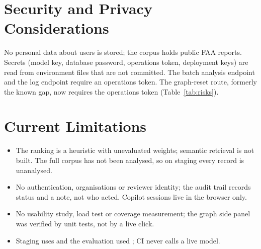 \section{Security and Privacy Considerations}
No personal data about users is stored; the corpus holds public FAA reports. Secrets (model key, database password, operations token, deployment keys) are read from environment files that are not committed. The batch analysis endpoint and the log endpoint require an operations token. The graph-reset route, formerly the known gap, now requires the operations token (Table~\ref{tab:risks}).

\section{Current Limitations}
\begin{itemize}
\item The ranking is a heuristic with unevaluated weights; semantic retrieval is not built. The full corpus has not been analysed, so on staging every record is unanalysed.
\item No authentication, organisations or reviewer identity; the audit trail records status and a note, not who acted. Copilot sessions live in the browser only.
\item No usability study, load test or coverage measurement; the graph side panel was verified by unit tests, not by a live click.
\item Staging uses  and the evaluation used ; CI never calls a live model.
\end{itemize}
